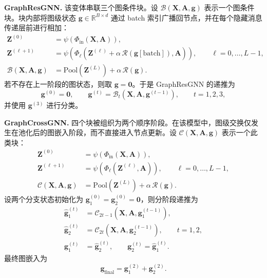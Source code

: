 \textbf{GraphResGNN.} 该变体串联三个图条件块。设 $\mathcal{B}(\mathbf{X},\mathbf{A},\mathbf{g})$ 表示一个图条件块。块内部将图级状态 $\mathbf{g}\in\mathbb{R}^{B\times d}$ 通过 batch 索引广播回节点，并在每个隐藏消息传递层前进行相加：
\begin{align}
\mathbf{Z}^{(0)} &= \psi\!\left(\Phi_{\mathrm{in}}(\mathbf{X},\mathbf{A})\right), \\
\mathbf{Z}^{(\ell+1)} &=
\psi\!\left(
\Phi_{\ell}\!\left(
\mathbf{Z}^{(\ell)} + \alpha\,\mathcal{R}\!\left(\mathbf{g}[\mathrm{batch}]\right), \mathbf{A}
\right)
\right), \qquad \ell=0,\dots,L-1, \\
\mathcal{B}(\mathbf{X},\mathbf{A},\mathbf{g}) &=
\mathrm{Pool}\!\left(\mathbf{Z}^{(L)}\right) + \alpha\,\mathcal{R}(\mathbf{g}).
\end{align}
若不存在上一阶段的图状态，则取 $\mathbf{g}=\mathbf{0}$。于是 GraphResGNN 的递推为
\begin{equation}
\mathbf{g}^{(0)}=\mathbf{0}, \qquad
\mathbf{g}^{(t)} = \mathcal{B}_{t}\!\left(\mathbf{X}, \mathbf{A}, \mathbf{g}^{(t-1)}\right), \qquad t=1,2,3,
\end{equation}
并使用 $\mathbf{g}^{(3)}$ 进行分类。

\textbf{GraphCrossGNN.} 四个块被组织为两个顺序阶段。在该模型中，图级交换仅发生在池化后的图嵌入阶段，而不直接进入节点更新。设 $\mathcal{C}(\mathbf{X},\mathbf{A},\mathbf{g})$ 表示一个此类块：
\begin{align}
\mathbf{Z}^{(0)} &= \psi\!\left(\Phi_{\mathrm{in}}(\mathbf{X},\mathbf{A})\right), \\
\mathbf{Z}^{(\ell+1)} &= \psi\!\left(\Phi_{\ell}\!\left(\mathbf{Z}^{(\ell)},\mathbf{A}\right)\right), \qquad \ell=0,\dots,L-1, \\
\mathcal{C}(\mathbf{X},\mathbf{A},\mathbf{g}) &= \mathrm{Pool}\!\left(\mathbf{Z}^{(L)}\right) + \alpha\,\mathcal{R}(\mathbf{g}).
\end{align}
设两个分支状态初始化为 $\mathbf{g}^{(0)}_{1}=\mathbf{g}^{(0)}_{2}=\mathbf{0}$，则分阶段递推为
\begin{align}
\widehat{\mathbf{g}}^{(t)}_{1} &= \mathcal{C}_{2t-1}\!\left(\mathbf{X}, \mathbf{A}, \mathbf{g}^{(t-1)}_{1}\right), \\
\widehat{\mathbf{g}}^{(t)}_{2} &= \mathcal{C}_{2t}\!\left(\mathbf{X}, \mathbf{A}, \mathbf{g}^{(t-1)}_{2}\right), \qquad t=1,2, \\
\mathbf{g}^{(t)}_{1} &= \widehat{\mathbf{g}}^{(t)}_{2}, \qquad
\mathbf{g}^{(t)}_{2} = \widehat{\mathbf{g}}^{(t)}_{1}.
\end{align}
最终图嵌入为
\begin{equation}
\mathbf{g}_{\mathrm{final}} = \mathbf{g}^{(2)}_{1} + \mathbf{g}^{(2)}_{2}.
\end{equation}

